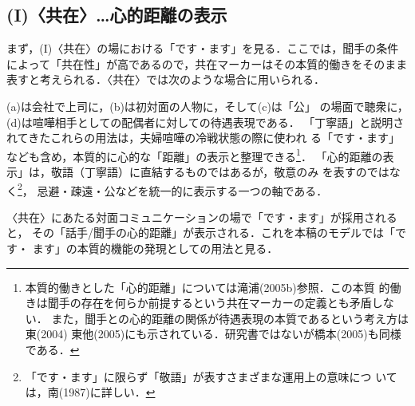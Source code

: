 \documentclass[japanese]{jnlp_1.3c}
\begin{document}
\subsection{(I)〈共在〉{\unskip}…心的距離の表示}\label{Ikyori}

まず，(I)〈共在〉の場における「です・ます」を見る．ここでは，聞手の条件
によって「共在性」が高であるので，共在マーカーはその本質的働きをそのまま
表すと考えられる．〈共在〉では次のような場合に用いられる．


(a)は会社で上司に，(b)は初対面の人物に，そして(c)は「公」
の場面で聴衆に，(d)は喧嘩相手としての配偶者に対しての待遇表現である．
「丁寧語」と説明されてきたこれらの用法は，夫婦喧嘩の冷戦状態の際に使われ
る「です・ます」なども含め，本質的に心的な「距離」の表示と整理できる\footnote{
	本質的働きとした「心的距離」については滝浦(2005b)参照．この本質
	的働きは聞手の存在を何らか前提するという共在マーカーの定義とも矛盾しない．
	また，聞手との心的距離の関係が待遇表現の本質であるという考え方は東(2004)
	東他(2005)にも示されている．研究書ではないが橋本(2005)も同様である．}．
「心的距離の表示」は，敬語（丁寧語）に直結するものではあるが，敬意のみ
を表すのではなく\footnote{
	「です・ます」に限らず「敬語」が表すさまざまな運用上の意味につ
	いては，南(1987)に詳しい．}，
忌避・疎遠・公などを統一的に表示する一つの軸である．

〈共在〉にあたる対面コミュニケーションの場で「です・ます」が採用されると，
その「話手/聞手の心的距離」が表示される．これを本稿のモデルでは「です・
ます」の本質的機能の発現としての用法と見る．

\end{document}
